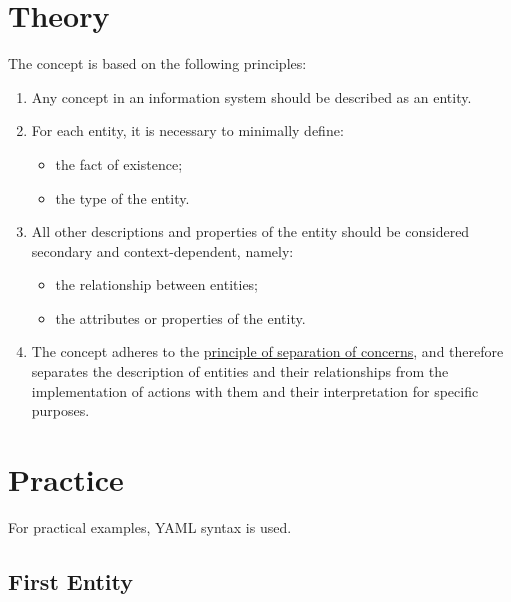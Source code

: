 \documentclass[final]{article}
\begin{document}
    \section{Theory}

        The concept is based on the following principles:

        \begin{enumerate}
            \item Any concept in an information system should be described as
            an entity.
            
            \item For each entity, it is necessary to minimally define:
            \begin{itemize}
                \item the fact of existence;
                \item the type of the entity.
            \end{itemize}

            \item All other descriptions and properties of the entity should be considered secondary and context-dependent, namely:
            \begin{itemize}
                \item the relationship between entities;
                \item the attributes or properties of the entity.
            \end{itemize}

            \item The concept adheres to the
            \href{https://en.wikipedia.org/wiki/Separation_of_concerns}{principle of
            separation of concerns}, and therefore separates the description of entities and their
            relationships from the implementation of actions with them and their
            interpretation for specific purposes.

        \end{enumerate}

    \section{Practice}

        For practical examples, YAML syntax is used.

        \subsection{First Entity}
\end{document}
